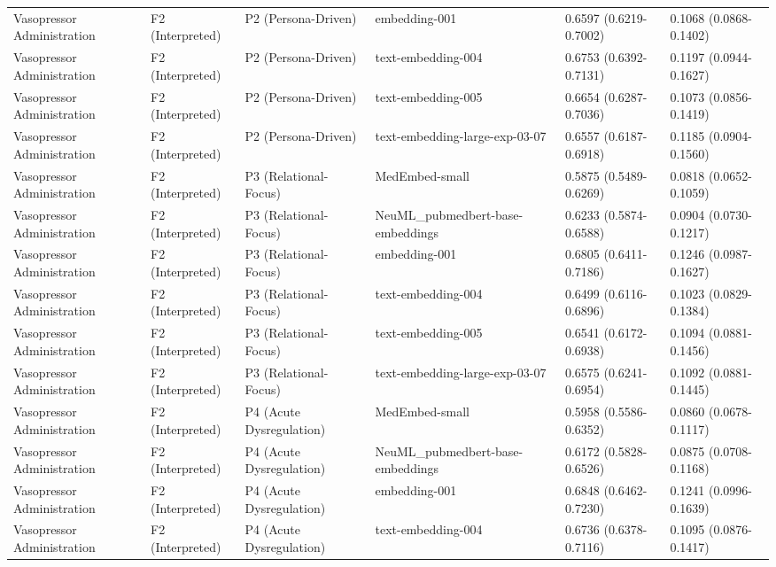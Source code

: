 \begin{tabular}{llllll}
Vasopressor Administration & F2 (Interpreted) & P2 (Persona-Driven) & embedding-001 & 0.6597 (0.6219-0.7002) & 0.1068 (0.0868-0.1402) \\
Vasopressor Administration & F2 (Interpreted) & P2 (Persona-Driven) & text-embedding-004 & 0.6753 (0.6392-0.7131) & 0.1197 (0.0944-0.1627) \\
Vasopressor Administration & F2 (Interpreted) & P2 (Persona-Driven) & text-embedding-005 & 0.6654 (0.6287-0.7036) & 0.1073 (0.0856-0.1419) \\
Vasopressor Administration & F2 (Interpreted) & P2 (Persona-Driven) & text-embedding-large-exp-03-07 & 0.6557 (0.6187-0.6918) & 0.1185 (0.0904-0.1560) \\
Vasopressor Administration & F2 (Interpreted) & P3 (Relational-Focus) & MedEmbed-small & 0.5875 (0.5489-0.6269) & 0.0818 (0.0652-0.1059) \\
Vasopressor Administration & F2 (Interpreted) & P3 (Relational-Focus) & NeuML\_pubmedbert-base-embeddings & 0.6233 (0.5874-0.6588) & 0.0904 (0.0730-0.1217) \\
Vasopressor Administration & F2 (Interpreted) & P3 (Relational-Focus) & embedding-001 & 0.6805 (0.6411-0.7186) & 0.1246 (0.0987-0.1627) \\
Vasopressor Administration & F2 (Interpreted) & P3 (Relational-Focus) & text-embedding-004 & 0.6499 (0.6116-0.6896) & 0.1023 (0.0829-0.1384) \\
Vasopressor Administration & F2 (Interpreted) & P3 (Relational-Focus) & text-embedding-005 & 0.6541 (0.6172-0.6938) & 0.1094 (0.0881-0.1456) \\
Vasopressor Administration & F2 (Interpreted) & P3 (Relational-Focus) & text-embedding-large-exp-03-07 & 0.6575 (0.6241-0.6954) & 0.1092 (0.0881-0.1445) \\
Vasopressor Administration & F2 (Interpreted) & P4 (Acute Dysregulation) & MedEmbed-small & 0.5958 (0.5586-0.6352) & 0.0860 (0.0678-0.1117) \\
Vasopressor Administration & F2 (Interpreted) & P4 (Acute Dysregulation) & NeuML\_pubmedbert-base-embeddings & 0.6172 (0.5828-0.6526) & 0.0875 (0.0708-0.1168) \\
Vasopressor Administration & F2 (Interpreted) & P4 (Acute Dysregulation) & embedding-001 & 0.6848 (0.6462-0.7230) & 0.1241 (0.0996-0.1639) \\
Vasopressor Administration & F2 (Interpreted) & P4 (Acute Dysregulation) & text-embedding-004 & 0.6736 (0.6378-0.7116) & 0.1095 (0.0876-0.1417) \\

\end{tabular}
